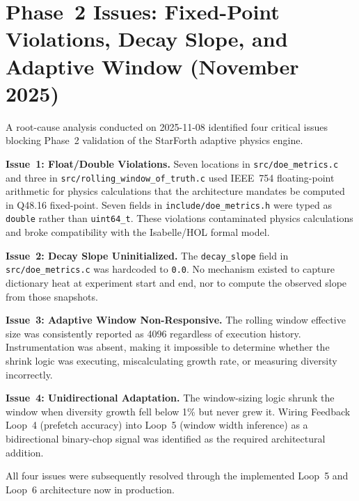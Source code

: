 
\section*{Phase~2 Issues: Fixed-Point Violations, Decay Slope, and Adaptive Window (November 2025)}

A root-cause analysis conducted on 2025-11-08 identified four critical issues
blocking Phase~2 validation of the StarForth adaptive physics engine.

\textbf{Issue~1: Float/Double Violations.}
Seven locations in \texttt{src/doe\_metrics.c} and three in
\texttt{src/rolling\_window\_of\_truth.c} used IEEE~754 floating-point
arithmetic for physics calculations that the architecture mandates be computed
in Q48.16 fixed-point. Seven fields in \texttt{include/doe\_metrics.h} were
typed as \texttt{double} rather than \texttt{uint64\_t}. These violations
contaminated physics calculations and broke compatibility with the Isabelle/HOL
formal model.

\textbf{Issue~2: Decay Slope Uninitialized.}
The \texttt{decay\_slope} field in \texttt{src/doe\_metrics.c} was hardcoded
to \texttt{0.0}. No mechanism existed to capture dictionary heat at experiment
start and end, nor to compute the observed slope from those snapshots.

\textbf{Issue~3: Adaptive Window Non-Responsive.}
The rolling window effective size was consistently reported as 4096 regardless
of execution history. Instrumentation was absent, making it impossible to
determine whether the shrink logic was executing, miscalculating growth rate,
or measuring diversity incorrectly.

\textbf{Issue~4: Unidirectional Adaptation.}
The window-sizing logic shrunk the window when diversity growth fell below 1\%
but never grew it. Wiring Feedback Loop~4 (prefetch accuracy) into Loop~5
(window width inference) as a bidirectional binary-chop signal was identified
as the required architectural addition.

All four issues were subsequently resolved through the implemented Loop~5 and
Loop~6 architecture now in production.
